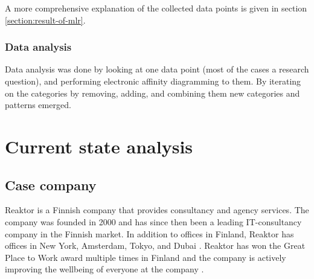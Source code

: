 \documentclass[english, 12pt, a4paper, sci, utf8, a-1b, online]{aaltothesis}
\begin{document}

A more comprehensive explanation of the collected data points is given in section \ref{section:result-of-mlr}.

\subsubsection{Data analysis}

Data analysis was done by looking at one data point (most of the cases a research question), and performing electronic affinity diagramming to them. By iterating on the categories by removing, adding, and combining them new categories and patterns emerged.

\clearpage
\section{Current state analysis}

\subsection{Case company}

Reaktor is a Finnish company that provides consultancy and agency services. The company was founded in 2000 and has since then been a leading IT-consultancy company in the Finnish market. In addition to offices in Finland, Reaktor has offices in New York, Amsterdam, Tokyo, and Dubai \citep{reaktor-home}. Reaktor has won the Great Place to Work award multiple times in Finland \citep{reaktor-gptw} and the company is actively improving the wellbeing of everyone at the company \citep{talouselama-reaktor}.
\end{document}
